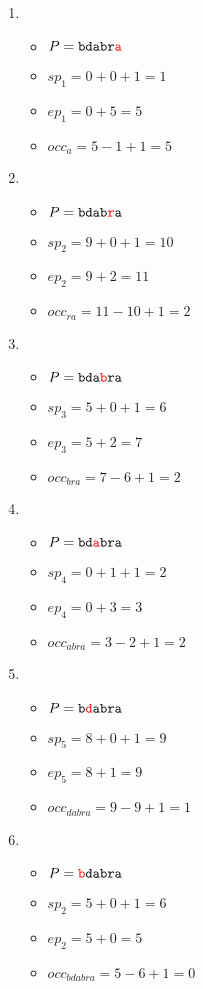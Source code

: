 \begin{enumerate}
\item \begin{itemize}
	\item $P=\texttt{bdabr{\color{red}{a}}}$
	\item $sp_1 = 0+0+1 = 1$
	\item $ep_1 = 0+5 = 5$
	\item $occ_{a} = 5-1+1 = 5$
	\end{itemize}
\item \begin{itemize}
	\item $P=\texttt{bdab{\color{red}{r}}a}$
	\item $sp_2 = 9+0+1 = 10$
	\item $ep_2 = 9+2 = 11$
	\item $occ_{ra} = 11-10+1 = 2$
	\end{itemize}
\item \begin{itemize}
	\item $P=\texttt{bda{\color{red}{b}}ra}$
	\item $sp_3 = 5+0+1 = 6$
	\item $ep_3 = 5+2 = 7$
	\item $occ_{bra} = 7-6+1 = 2$
	\end{itemize}
\item \begin{itemize}
	\item $P=\texttt{bd{\color{red}{a}}bra}$
	\item $sp_4 = 0+1+1 = 2$
	\item $ep_4 = 0+3 = 3$
	\item $occ_{abra} = 3-2+1 = 2$
	\end{itemize}
\item \begin{itemize}
	\item $P=\texttt{b{\color{red}{d}}abra}$
	\item $sp_5 = 8+0+1 = 9$
	\item $ep_5 = 8+1 = 9$
	\item $occ_{dabra} = 9-9+1 = 1$
	\end{itemize}
\item \begin{itemize}
	\item $P=\texttt{{\color{red}{b}}dabra}$
	\item $sp_2 = 5+0+1 = 6$
	\item $ep_2 = 5+0 = 5$
	\item $occ_{bdabra} = 5-6+1 = 0$
	\end{itemize}
\end{enumerate}
